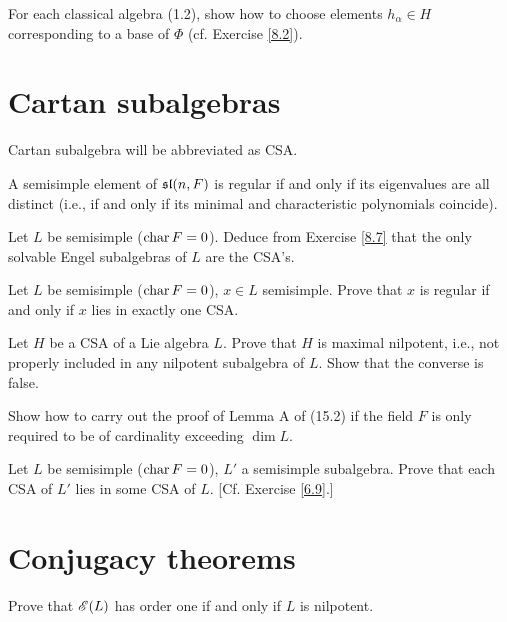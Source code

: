 \begin{ex}
  For each classical algebra (1.2), show how to choose elements $h_{\alpha}\in H$ corresponding to a base of $\Phi$ (cf. Exercise \ref{8.2}).
\end{ex}

\section{Cartan subalgebras}
Cartan subalgebra will be abbreviated as CSA.

\begin{ex}
  A semisimple element of $\sl(n, F)$ is regular if and only if its eigenvalues are all distinct (i.e., if and only if its minimal and characteristic polynomials coincide).
\end{ex}

\begin{ex}
  Let $L$ be semisimple ($\Char F = 0$). Deduce from Exercise \ref{8.7} that the only solvable Engel subalgebras of $L$ are the CSA's.
\end{ex}

\begin{ex}
  Let $L$ be semisimple ($\Char F = 0$), $x \in L$ semisimple. Prove that $x$ is regular if and only if $x$ lies in exactly one CSA.
\end{ex}

\begin{ex}
  Let $H$ be a CSA of a Lie algebra $L$. Prove that $H$ is maximal nilpotent, i.e., not properly included in any nilpotent subalgebra of $L$. Show that the converse is false.
\end{ex}

\begin{ex}
  Show how to carry out the proof of Lemma A of (15.2) if the field $F$ is only required to be of cardinality exceeding $\dim L$.
\end{ex}

\begin{ex}
  Let $L$ be semisimple ($\Char F = 0$), $L'$ a semisimple subalgebra. Prove that each CSA of $L'$ lies in some CSA of $L$. [Cf. Exercise \ref{6.9}.]
\end{ex}

\section{Conjugacy theorems}
\begin{ex}
  Prove that $\Eee(L)$ has order one if and only if $L$ is nilpotent.
\end{ex}

